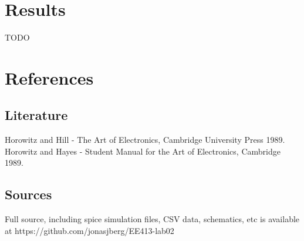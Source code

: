 \documentclass[11pt,a4paper]{article}
\begin{document}
\section{Results}\label{setup}
TODO

\newpage

\section{References}\label{references}

\subsection{Literature}\label{literature}
Horowitz and Hill - The Art of Electronics, Cambridge University Press
1989. Horowitz and Hayes - Student Manual for the Art of Electronics,
Cambridge 1989.

\subsection{Sources}\label{sources}
Full source, including spice simulation files, CSV data, schematics, etc
is available at https://github.com/jonasjberg/EE413-lab02


\end{document}
